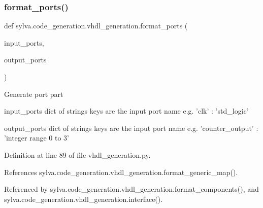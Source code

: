 \mbox{\label{namespacesylva_1_1code__generation_1_1vhdl__generation_ac44fef3535243add66477e8198d8b0a5}} 
\subsubsection{\texorpdfstring{format\+\_\+ports()}{format\_ports()}}
{\footnotesize\ttfamily def sylva.\+code\+\_\+generation.\+vhdl\+\_\+generation.\+format\+\_\+ports (\begin{DoxyParamCaption}\item[{}]{input\+\_\+ports,  }\item[{}]{output\+\_\+ports }\end{DoxyParamCaption})}

\begin{DoxyVerb}Generate port part

  input_ports
    dict of strings
    keys are the input port name
    e.g. { 'clk' : 'std_logic' }

  output_ports
    dict of strings
    keys are the input port name
    e.g. { 'counter_output' : 'integer range 0 to 3' }
\end{DoxyVerb}
 

Definition at line 89 of file vhdl\+\_\+generation.\+py.



References sylva.\+code\+\_\+generation.\+vhdl\+\_\+generation.\+format\+\_\+generic\+\_\+map().



Referenced by sylva.\+code\+\_\+generation.\+vhdl\+\_\+generation.\+format\+\_\+components(), and sylva.\+code\+\_\+generation.\+vhdl\+\_\+generation.\+interface().


